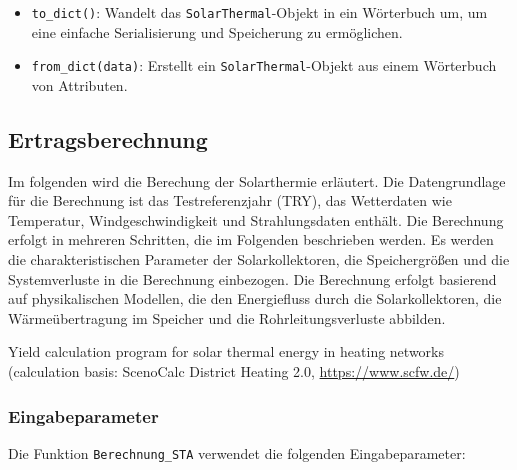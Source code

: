\begin{itemize}
    \item \texttt{to\_dict()}: Wandelt das \texttt{SolarThermal}-Objekt in ein Wörterbuch um, um eine einfache Serialisierung und Speicherung zu ermöglichen.
    
    \item \texttt{from\_dict(data)}: Erstellt ein \texttt{SolarThermal}-Objekt aus einem Wörterbuch von Attributen.
\end{itemize}

\subsection{Ertragsberechnung}

Im folgenden wird die Berechung der Solarthermie erläutert. Die Datengrundlage für die Berechnung ist das Testreferenzjahr (TRY), das Wetterdaten wie Temperatur, Windgeschwindigkeit und Strahlungsdaten enthält. Die Berechnung erfolgt in mehreren Schritten, die im Folgenden beschrieben werden. Es werden die charakteristischen Parameter der Solarkollektoren, die Speichergrößen und die Systemverluste in die Berechnung einbezogen. Die Berechnung erfolgt basierend auf physikalischen Modellen, die den Energiefluss durch die Solarkollektoren, die Wärmeübertragung im Speicher und die Rohrleitungsverluste abbilden.

Yield calculation program for solar thermal energy in heating networks (calculation basis: ScenoCalc District Heating 2.0, \url{https://www.scfw.de/})

\subsubsection*{Eingabeparameter}

Die Funktion \texttt{Berechnung\_STA} verwendet die folgenden Eingabeparameter:

